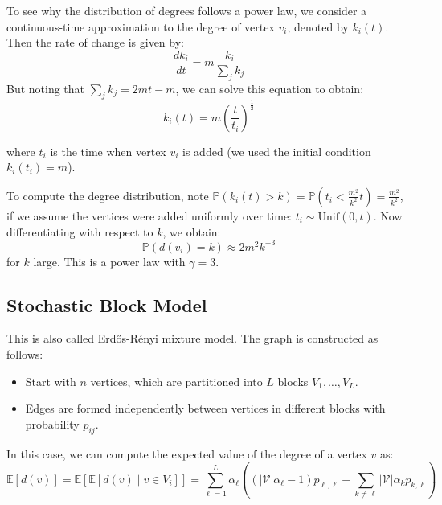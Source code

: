 \documentclass{article}
\begin{document}
\begin{unexaminable}
    To see why the distribution of degrees follows a power law, we consider a continuous-time approximation to the degree of vertex $v_i$, denoted by $k_i(t)$. Then the rate of change is given by:
    \begin{equation*}
        \frac{d k_i}{dt} = m \frac{k_i}{\sum_j k_j}
    \end{equation*}
    But noting that $\sum_j k_j = 2mt - m$, we can solve this equation  to obtain:
    \begin{equation*}
        k_i(t) = m \left( \frac{t}{t_i} \right)^{\frac{1}{2}}
    \end{equation*}

    where $t_i$ is the time when vertex $v_i$ is added (we used the initial condition $k_i(t_i)=m$).

    To compute the degree distribution, note $\mathbb{P}(k_i(t)>k) = \mathbb{P}(t_i < \frac{m^2}{k^2} t) = \frac{m^2}{k^2}$, if we assume the vertices were added uniformly over time: $t_i \sim \mathrm{Unif}(0,t)$. Now differentiating with respect to $k$, we obtain:
    \begin{equation*}
        \mathbb{P}(d(v_i)=k) \approx 2m^2 k^{-3}
    \end{equation*}
    for $k$ large. This is a power law with $\gamma=3$.
\end{unexaminable}

\subsection{Stochastic Block Model}

This is also called Erd\H{o}s-R\'{e}nyi mixture model. The graph is constructed as follows:
\begin{itemize}
    \item Start with $n$ vertices, which are partitioned into $L$ blocks $V_1,\ldots,V_L$.
    \item Edges are formed independently between vertices in different blocks with probability $p_{ij}$.
\end{itemize}

In this case, we can compute the expected value of the degree of a vertex $v$ as:
\begin{equation*}
    \mathbb{E}[d(v)] = \mathbb{E}[\mathbb{E}[d(v) \mid v \in V_i]] = \sum_{\ell=1}^L  \alpha_{\ell}\left((|\mathcal{V}|\alpha_{\ell}-1)p_{\ell,\ell}+\sum_{k\ne\ell}|\mathcal{V}|\alpha_{k}p_{k,\ell}\right)
\end{equation*}
\end{document}
